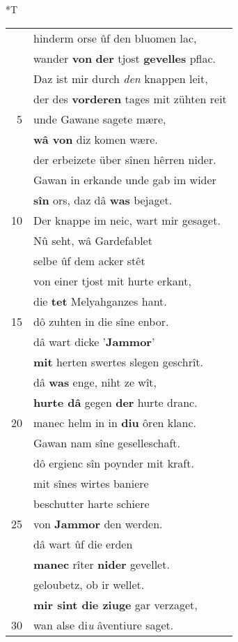 \documentclass[8pt,a4paper,notitlepage]{article}
\begin{document}
\begin{table}[ht]
\begin{minipage}[t]{0.5\linewidth}
\small
\begin{center}*T
\end{center}
\begin{tabular}{rl}
 & hinderm orse ûf den bluomen lac,\\ 
 & wander \textbf{von} \textbf{der} tjost \textbf{gevelles} pflac.\\ 
 & Daz ist mir durch \textit{den} knappen leit,\\ 
 & der des \textbf{vorderen} tages mit zühten reit\\ 
5 & unde Gawane sagete mære,\\ 
 & \textbf{wâ von} diz komen wære.\\ 
 & der erbeizete über sînen hêrren nider.\\ 
 & Gawan in erkande unde gab im wider\\ 
 & \textbf{sîn} ors, daz dâ \textbf{was} bejaget.\\ 
10 & Der knappe im neic, wart mir gesaget.\\ 
 & Nû seht, wâ Gardefablet\\ 
 & selbe ûf dem acker stêt\\ 
 & von einer tjost mit hurte erkant,\\ 
 & die \textbf{tet} Melyahganzes hant.\\ 
15 & dô zuhten in die sîne enbor.\\ 
 & dâ wart dicke '\textbf{Jammor}'\\ 
 & \textbf{mit} herten swertes slegen geschrît.\\ 
 & dâ \textbf{was} enge, niht ze wît,\\ 
 & \textbf{hurte dâ} gegen \textbf{der} hurte dranc.\\ 
20 & manec helm in in \textbf{diu} ôren klanc.\\ 
 & Gawan nam sîne geselleschaft.\\ 
 & dô ergienc sîn poynder mit kraft.\\ 
 & mit sînes wirtes baniere\\ 
 & beschutter harte schiere\\ 
25 & von \textbf{Jammor} den werden.\\ 
 & dâ wart ûf die erden\\ 
 & \textbf{manec} rîter \textbf{nider} gevellet.\\ 
 & geloubetz, ob ir wellet.\\ 
 & \textbf{mir sint die ziuge} gar verzaget,\\ 
30 & wan alse di\textit{u} âventiure saget.\\ 

\end{tabular}
\end{minipage}
\end{table}
\end{document}
